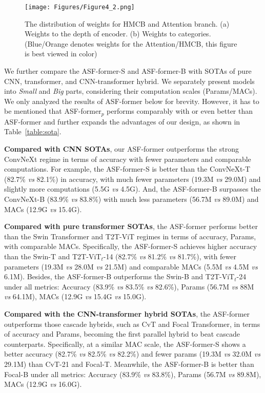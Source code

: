 \documentclass[lettersize,journal]{IEEEtran}
\begin{document}
\begin{figure*}
\centering
\texttt{[image: Figures/Figure4\_2.png]}
\caption{The distribution of weights for HMCB and Attention branch. (a) Weights to the depth of encoder. (b) Weights to categories. (Blue/Orange denotes weights for the Attention/HMCB, this figure is best viewed in color)}
\label{fig:vis}
\end{figure*}

We further compare the ASF-former-S and ASF-former-B with SOTAs of pure CNN, transformer, and CNN-transformer hybrid. We separately present models into \textit{Small} and \textit{Big} parts, considering their computation scales (Params/MACs). We only analyzed the results of ASF-former below for brevity. However, it has to be mentioned that ASF-former$_p$ performs comparably with or even better than ASF-former and further expands the advantages of our design, as shown in Table~\ref{table:sota}.

\textbf{Compared with CNN SOTAs}, our ASF-former outperforms the strong ConvNeXt regime in terms of accuracy with fewer parameters and comparable computations. For example, the {ASF-former-S} is better than the ConvNeXt-T ({82.7}\% \textit{vs} 82.1\%) in accuracy, with much fewer parameters ({19.3}M \textit{vs} 29.0M) and slightly more computations ({5.5}G \textit{vs} 4.5G). And, the {ASF-former-B} surpasses the ConvNeXt-B ({83.9}\% \textit{vs} 83.8\%) with much less parameters ({56.7}M \textit{vs} 89.0M) and MACs ({12.9}G \textit{vs} 15.4G). 

\textbf{Compared with pure transformer SOTAs}, the ASF-former performs better than the Swin Transformer and T2T-ViT regimes in terms of accuracy, Params, with comparable MACs. Specifically, the ASF-former-S achieves higher accuracy than the Swin-T and  T2T-ViT$_t$-14 (82.7\% \textit{vs} 81.2\% \textit{vs} 81.7\%), with fewer parameters (19.3M \textit{vs} 28.0M \textit{vs} 21.5M) and comparable MACs (5.5M \textit{vs} 4.5M \textit{vs} 6.1M). Besides, the ASF-former-B outperforms the Swin-B and T2T-ViT$_t$-24 under all metrics: Accuracy (83.9\% \textit{vs} 83.5\% \textit{vs} 82.6\%), Params (56.7M \textit{vs} 88M \textit{vs} 64.1M), MACs (12.9G \textit{vs} 15.4G \textit{vs} 15.0G).

\textbf{Compared with the CNN-transformer hybrid SOTAs}, the ASF-former outperforms those cascade hybrids, such as CvT and Focal Transformer, in terms of accuracy and Params, becoming the first parallel hybrid to beat cascade counterparts. Specifically, at a similar MAC scale, the ASF-former-S shows a better accuracy (82.7\% \textit{vs} 82.5\% \textit{vs} 82.2\%) and fewer params (19.3M \textit{vs} 32.0M \textit{vs} 29.1M) than CvT-21 and Focal-T. Meanwhile, the ASF-former-B is better than Focal-B under all metrics: Accuracy (83.9\% \textit{vs} 83.8\%), Params (56.7M \textit{vs} 89.8M), MACs (12.9G \textit{vs} 16.0G).
\end{document}
